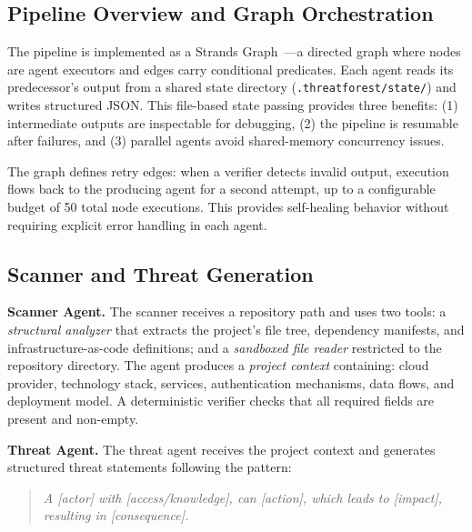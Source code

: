 \subsection{Pipeline Overview and Graph Orchestration}
\label{sec:orchestration}

The pipeline is implemented as a Strands Graph~\cite{strands2025}---a directed graph where nodes are agent executors and edges carry conditional predicates. Each agent reads its predecessor's output from a shared state directory (\texttt{.threatforest/state/}) and writes structured JSON. This file-based state passing provides three benefits: (1) intermediate outputs are inspectable for debugging, (2) the pipeline is resumable after failures, and (3) parallel agents avoid shared-memory concurrency issues.

The graph defines retry edges: when a verifier detects invalid output, execution flows back to the producing agent for a second attempt, up to a configurable budget of 50 total node executions. This provides self-healing behavior without requiring explicit error handling in each agent.

\subsection{Scanner and Threat Generation}
\label{sec:scanner-threat}

\textbf{Scanner Agent.} The scanner receives a repository path and uses two tools: a \emph{structural analyzer} that extracts the project's file tree, dependency manifests, and infrastructure-as-code definitions; and a \emph{sandboxed file reader} restricted to the repository directory. The agent produces a \emph{project context} containing: cloud provider, technology stack, services, authentication mechanisms, data flows, and deployment model. A deterministic verifier checks that all required fields are present and non-empty.

\textbf{Threat Agent.} The threat agent receives the project context and generates structured threat statements following the pattern:

\begin{quote}
\emph{A [actor] with [access/knowledge], can [action], which leads to [impact], resulting in [consequence].}
\end{quote}

